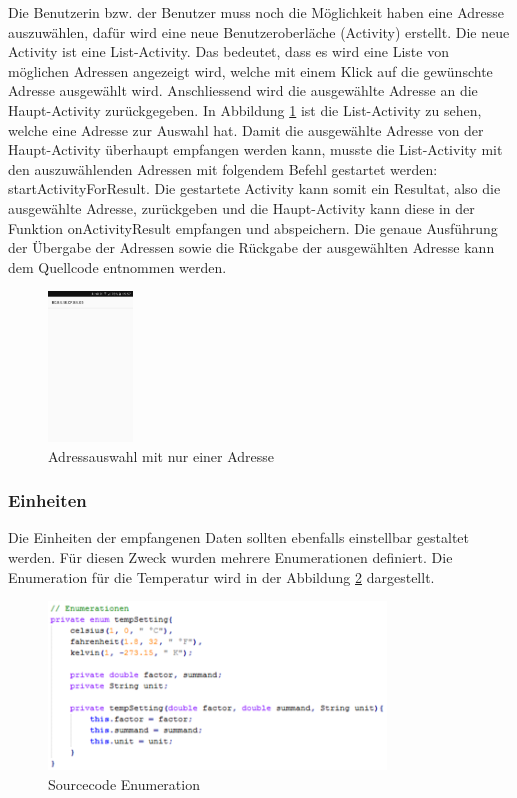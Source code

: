 Die Benutzerin bzw. der Benutzer muss noch die Möglichkeit haben eine Adresse auszuwählen, dafür wird eine neue Benutzeroberläche (Activity) erstellt. Die neue Activity ist eine List-Activity. Das bedeutet, dass es wird eine Liste von möglichen Adressen angezeigt wird, welche mit einem Klick auf die gewünschte Adresse ausgewählt wird. Anschliessend wird die ausgewählte Adresse an die Haupt-Activity zurückgegeben. In Abbildung \ref{BLEadressauswahl} ist die List-Activity zu sehen, welche eine Adresse zur Auswahl hat. Damit die ausgewählte Adresse von der Haupt-Activity überhaupt empfangen werden kann, musste die List-Activity mit den auszuwählenden Adressen mit folgendem Befehl gestartet werden: startActivityForResult. Die gestartete Activity kann somit ein Resultat, also die ausgewählte Adresse, zurückgeben und die Haupt-Activity kann diese in der Funktion onActivityResult empfangen und abspeichern. Die genaue Ausführung der Übergabe der Adressen sowie die Rückgabe der ausgewählten Adresse kann dem Quellcode entnommen werden.

\begin{figure}[ht]
    \includegraphics[width=0.2\textwidth]{3Vorgehen/imag/BLEAdresseAuswaehlen.png}
    \caption{Adressauswahl mit nur einer Adresse}
	\label{BLEadressauswahl} 
\end{figure}


\subsubsection{Einheiten}


Die Einheiten der empfangenen Daten sollten ebenfalls einstellbar gestaltet werden. Für diesen Zweck wurden mehrere Enumerationen definiert. Die Enumeration für die Temperatur wird in der Abbildung \ref{app_tempSetting} dargestellt.\\

\begin{figure}[ht]
    \includegraphics[width=0.8\textwidth]{3Vorgehen/imag/app_tempSetting.png}
    \caption{Sourcecode Enumeration}
	\label{app_tempSetting}
\end{figure}


